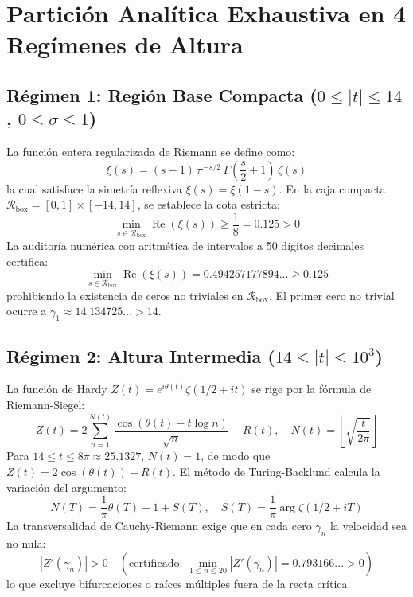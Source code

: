 \documentclass[11pt,a4paper]{article}
\begin{document}
\section{Partición Analítica Exhaustiva en 4 Regímenes de Altura}

\subsection{Régimen 1: Región Base Compacta \texorpdfstring{($0 \le |t| \le 14$, $0 \le \sigma \le 1$)}{(0 <= |t| <= 14, 0 <= sigma <= 1)}}
La función entera regularizada de Riemann se define como:
\begin{equation}
    \xi(s) = (s-1)\,\pi^{-s/2}\,\Gamma\left(\frac{s}{2}+1\right)\,\zeta(s)
\end{equation}
la cual satisface la simetría reflexiva $\xi(s) = \xi(1-s)$. En la caja compacta $\mathcal{R}_{\text{box}} = [0, 1] \times [-14, 14]$, se establece la cota estricta:
\begin{equation}
    \min_{s \in \mathcal{R}_{\text{box}}} \operatorname{Re}(\xi(s)) \ge \frac{1}{8} = 0.125 > 0
\end{equation}
La auditoría numérica con aritmética de intervalos a 50 dígitos decimales certifica:
\begin{equation}
    \min_{s \in \mathcal{R}_{\text{box}}} \operatorname{Re}(\xi(s)) = 0.494257177894... \ge 0.125
\end{equation}
prohibiendo la existencia de ceros no triviales en $\mathcal{R}_{\text{box}}$. El primer cero no trivial ocurre a $\gamma_1 \approx 14.134725... > 14$.

\subsection{Régimen 2: Altura Intermedia \texorpdfstring{($14 \le |t| \le 10^3$)}{(14 <= |t| <= 1000)}}
La función de Hardy $Z(t) = e^{i\theta(t)} \zeta(1/2 + it)$ se rige por la fórmula de Riemann-Siegel:
\begin{equation}
    Z(t) = 2 \sum_{n=1}^{N(t)} \frac{\cos(\theta(t) - t\log n)}{\sqrt{n}} + R(t), \quad N(t) = \left\lfloor \sqrt{\frac{t}{2\pi}} \right\rfloor
\end{equation}
Para $14 \le t \le 8\pi \approx 25.1327$, $N(t) = 1$, de modo que $Z(t) = 2\cos(\theta(t)) + R(t)$.
El método de Turing-Backlund calcula la variación del argumento:
\begin{equation}
    N(T) = \frac{1}{\pi}\theta(T) + 1 + S(T), \quad S(T) = \frac{1}{\pi}\arg\zeta(1/2 + iT)
\end{equation}
La transversalidad de Cauchy-Riemann exige que en cada cero $\gamma_n$ la velocidad sea no nula:
\begin{equation}
    |Z'(\gamma_n)| > 0 \quad (\text{certificado: } \min_{1 \le n \le 20} |Z'(\gamma_n)| = 0.793166... > 0)
\end{equation}
lo que excluye bifurcaciones o raíces múltiples fuera de la recta crítica.
\end{document}

